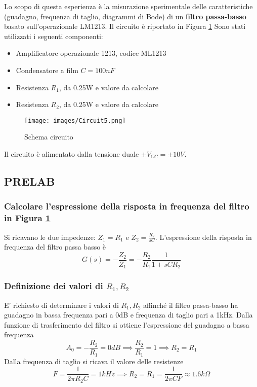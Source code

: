 Lo scopo di questa esperienza è la misurazione sperimentale delle caratteristiche (guadagno, frequenza di taglio, diagrammi di Bode) di un \textbf{filtro passa-basso} basato sull’operazionale LM1213. Il circuito è riportato in Figura \ref{fig:Circuit5}
Sono stati utilizzati i seguenti componenti:
\begin{itemize}
    \item Amplificatore operazionale 1213, codice ML1213
    \item Condensatore a film $C=100nF$
    \item Resistenza $R_1$, da 0.25W e valore da calcolare
    \item Resistenza $R_2$, da 0.25W e valore da calcolare
\end{itemize}
\begin{figure}[H]
    \centering
    \texttt{[image: images/Circuit5.png]}
    \caption{Schema circuito}
    \label{fig:Circuit5}
\end{figure}
Il circuito è alimentato dalla tensione duale $\pm V_{CC}=\pm 10V$.
\subsection{PRELAB}
\subsubsection{Calcolare l'espressione della risposta in frequenza del filtro in Figura \ref{fig:Circuit5}}
Si ricavano le due impedenze: $Z_1=R_1$ e $Z_2=\frac{R_2}{sC}$. L'espressione della risposta in frequenza del filtro passa basso è
\begin{equation}
    G(s)=-\frac{Z_2}{Z_1}=-\frac{R_2}{R_1}\frac{1}{1+sCR_2}
\end{equation}
\subsubsection{Definizione dei valori di $R_1,R_2$}
E' richiesto di determinare i valori di $R_1,R_2$ affinché il filtro passa-basso ha guadagno in bassa frequenza pari a 0dB e frequenza di taglio pari a 1kHz. Dalla funzione di trasferimento del filtro si ottiene l'espressione del guadagno a bassa frequenza
\begin{equation}
    A_0=-\frac{R_2}{R_1}=0dB\implies \frac{R_2}{R_1}=1\implies R_2=R_1
\end{equation}
Dalla frequenza di taglio si ricava il valore delle resistenze
\begin{equation}
    F=\frac{1}{2\pi R_2C}=1kHz\implies R_2=R_1=\frac{1}{2\pi CF}\approx1.6k\Omega
\end{equation}
